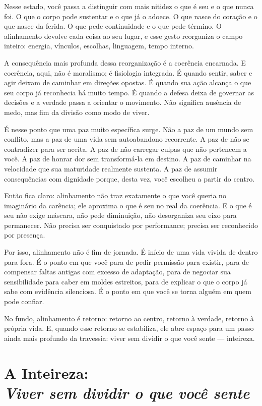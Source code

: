 \documentclass[12pt]{book}
\begin{document}
Nesse estado, você passa a distinguir com mais nitidez o que é seu e o que nunca foi. O que o corpo pode sustentar e o que já o adoece. O que nasce do coração e o que nasce da ferida. O que pede continuidade e o que pede término. O alinhamento devolve cada coisa ao seu lugar, e esse gesto reorganiza o campo inteiro: energia, vínculos, escolhas, linguagem, tempo interno.

A consequência mais profunda dessa reorganização é a coerência encarnada. E coerência, aqui, não é moralismo; é fisiologia integrada. É quando sentir, saber e agir deixam de caminhar em direções opostas. É quando sua ação alcança o que seu corpo já reconhecia há muito tempo. É quando a defesa deixa de governar as decisões e a verdade passa a orientar o movimento. Não significa ausência de medo, mas fim da divisão como modo de viver.

É nesse ponto que uma paz muito específica surge. Não a paz de um mundo sem conflito, mas a paz de uma vida sem autoabandono recorrente. A paz de não se contradizer para ser aceita. A paz de não carregar culpas que não pertencem a você. A paz de honrar dor sem transformá-la em destino. A paz de caminhar na velocidade que sua maturidade realmente sustenta. A paz de assumir consequências com dignidade porque, desta vez, você escolheu a partir do centro.

Então fica claro: alinhamento não traz exatamente o que você queria no imaginário da carência; ele aproxima o que é seu no real da coerência. E o que é seu não exige máscara, não pede diminuição, não desorganiza seu eixo para permanecer. Não precisa ser conquistado por performance; precisa ser reconhecido por presença.

Por isso, alinhamento não é fim de jornada. É início de uma vida vivida de dentro para fora. É o ponto em que você para de pedir permissão para existir, para de compensar faltas antigas com excesso de adaptação, para de negociar sua sensibilidade para caber em moldes estreitos, para de explicar o que o corpo já sabe com evidência silenciosa. É o ponto em que você se torna alguém em quem pode confiar.

No fundo, alinhamento é retorno: retorno ao centro, retorno à verdade, retorno à própria vida. E, quando esse retorno se estabiliza, ele abre espaço para um passo ainda mais profundo da travessia: viver sem dividir o que você sente — inteireza.

\chapter[A Inteireza: Viver sem dividir o que você sente]{A Inteireza:\\[0.4ex]\large\itshape Viver sem dividir o que você sente}
\end{document}
